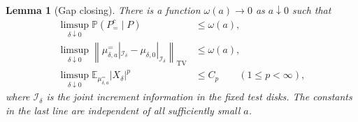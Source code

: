 \documentclass[11pt]{article}
\newtheorem{lemma}[theorem]{Lemma}
\theoremstyle{definition}
\theoremstyle{remark}
\numberwithin{equation}{section}
\begin{document}
\begin{lemma}[Gap closing]\label{pins:gap-closing}
There is a function $\omega(a)\to0$ as $a\downarrow0$ such that
\begin{align}
 \limsup_{\delta\downarrow0}
       \mathbb P(P_=^c\mid P)&\le\omega(a),
       \label{pins:offset-synchronization}\\
 \limsup_{\delta\downarrow0}
 \left\|\mu_{\delta,a}^{=}|_{\mathcal I_\delta}
              -\mu_{\delta,0}|_{\mathcal I_\delta}\right\|_{\mathrm{TV}}
       &\le\omega(a),\label{pins:increment-tv}\\
 \limsup_{\delta\downarrow0}
       \mathbb E_{\mu_{\delta,a}^{=}}|X_\delta|^p
       &\le C_p\qquad(1\le p<\infty),
       \label{pins:uniform-common-moments}
\end{align}
where $\mathcal I_\delta$ is the joint increment information in the
fixed test disks.  The constants in the last line are independent of
all sufficiently small $a$.
\end{lemma}
\end{document}
